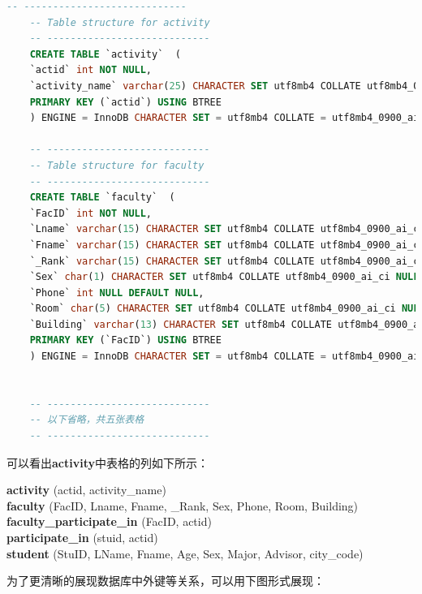 \documentclass{article}
\begin{document}
    \begin{lstlisting}[language=sql, title=activity.sql, tabsize=4]
    -- ----------------------------
    -- Table structure for activity
    -- ----------------------------
    CREATE TABLE `activity`  (
    `actid` int NOT NULL,
    `activity_name` varchar(25) CHARACTER SET utf8mb4 COLLATE utf8mb4_0900_ai_ci NULL DEFAULT NULL,
    PRIMARY KEY (`actid`) USING BTREE
    ) ENGINE = InnoDB CHARACTER SET = utf8mb4 COLLATE = utf8mb4_0900_ai_ci ROW_FORMAT = Dynamic;
    
    -- ----------------------------
    -- Table structure for faculty
    -- ----------------------------
    CREATE TABLE `faculty`  (
    `FacID` int NOT NULL,
    `Lname` varchar(15) CHARACTER SET utf8mb4 COLLATE utf8mb4_0900_ai_ci NULL DEFAULT NULL,
    `Fname` varchar(15) CHARACTER SET utf8mb4 COLLATE utf8mb4_0900_ai_ci NULL DEFAULT NULL,
    `_Rank` varchar(15) CHARACTER SET utf8mb4 COLLATE utf8mb4_0900_ai_ci NULL DEFAULT NULL,
    `Sex` char(1) CHARACTER SET utf8mb4 COLLATE utf8mb4_0900_ai_ci NULL DEFAULT NULL,
    `Phone` int NULL DEFAULT NULL,
    `Room` char(5) CHARACTER SET utf8mb4 COLLATE utf8mb4_0900_ai_ci NULL DEFAULT NULL,
    `Building` varchar(13) CHARACTER SET utf8mb4 COLLATE utf8mb4_0900_ai_ci NULL DEFAULT NULL,
    PRIMARY KEY (`FacID`) USING BTREE
    ) ENGINE = InnoDB CHARACTER SET = utf8mb4 COLLATE = utf8mb4_0900_ai_ci ROW_FORMAT = Dynamic;
    
    
    -- ----------------------------
    -- 以下省略，共五张表格
    -- ----------------------------
    \end{lstlisting}
    
    可以看出\textbf{activity}中表格的列如下所示：
    
    \begin{tcolorbox}[title = {\textbf{activity}的表格}, colback = blue!25!white, colframe = blue!75!black]
    	\textbf{activity} (actid, activity\_name) \\
    	\textbf{faculty} (FacID, Lname, Fname, \_Rank, Sex, Phone, Room, Building) \\
    	\textbf{faculty\_participate\_in} (FacID, actid) \\
    	\textbf{participate\_in} (stuid, actid) \\
    	\textbf{student} (StuID, LName, Fname, Age, Sex, Major, Advisor, city\_code)
    \end{tcolorbox}
    
    为了更清晰的展现数据库中外键等关系，可以用下图形式展现：
    
\end{document}
